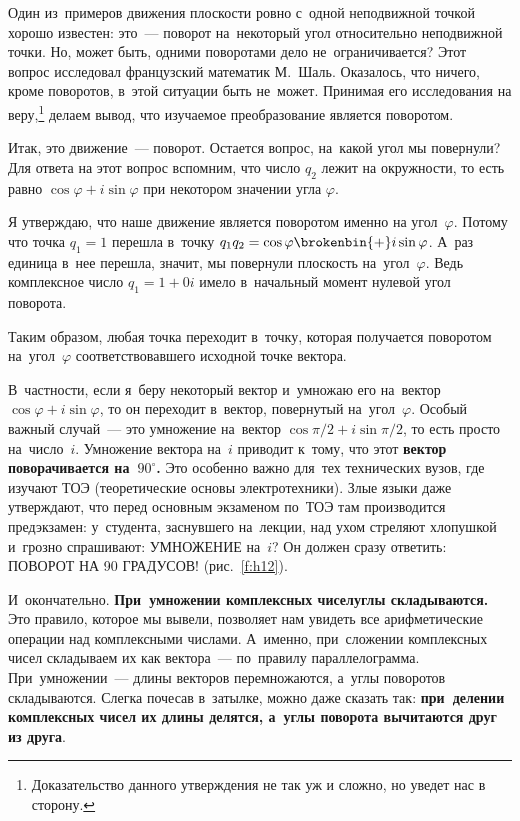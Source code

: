 Один из~примеров движения плоскости ровно с~одной неподвижной точкой хорошо
известен: это~--- поворот на~некоторый угол относительно неподвижной точки. Но,
может быть, одними поворотами дело не~ограничивается? Этот вопрос исследовал
французский математик М.~Шаль. Оказалось, что ничего, кроме поворотов, в~этой ситуации быть не~может.
Принимая его исследования на веру,\footnote{Доказательство
данного утверждения не так уж и сложно, но уведет нас в сторону.} делаем вывод, что
изучаемое преобразование является поворотом.

Итак, это движение~--- поворот. Остается вопрос, на~какой угол мы повернули?
Для ответа на этот вопрос вспомним, что число $q_2$ лежит на окружности, то
есть равно $\cos\varphi+i\sin\varphi$ при некотором значении угла $\varphi$.

Я утверждаю, что наше движение является поворотом именно на угол~$\varphi$.
Потому что точка $q_1=1$ перешла в~точку $q_1 q_2 = \cos\varphi\brokenbin{+}i\sin\varphi$.
А~раз единица в~нее перешла, значит, мы повернули плоскость на~угол~$\varphi$.
Ведь комплексное число $q_1=1+0i$ имело в~начальный момент нулевой угол поворота.

Таким образом, любая точка переходит в~точку, которая получается поворотом
на~угол~$\varphi$ соответствовавшего исходной точке вектора.

В~частности, если я~беру некоторый вектор и~умножаю его на~вектор $\cos\varphi+i\sin\varphi$, то он переходит в~вектор,
повернутый на~угол~$\varphi$. Особый важный случай~--- это умножение на~вектор $\cos \pi/2 + i \sin \pi/2$, то есть
просто на~число~$i$. Умножение вектора на~$i$ приводит к~тому, что этот \textbf{вектор поворачивается на~$90^{\circ}$.}
Это особенно важно для~тех технических вузов, где изучают ТОЭ (теоретические основы
электротехники). Злые языки даже утверждают, что перед основным экзаменом по~ТОЭ там производится
предэкзамен: у~студента, заснувшего на~лекции, над ухом стреляют хлопушкой и~грозно спрашивают:
УМНОЖЕНИЕ на~$i$? Он должен сразу ответить: ПОВОРОТ НА 90 ГРАДУСОВ! (рис.~\ref{f:h12}).

%


И~окончательно. \textbf{При~умножении комплексных чисел\linebreak углы складываются.} Это правило, которое мы вывели,
позволяет нам увидеть все арифметические операции над комплексными числами. А~именно, при~сложении
комплексных чисел складываем их как вектора~--- по~правилу параллелограмма. При~умножении~--- длины
векторов перемножаются, а~углы поворотов складываются. Слегка почесав в~затылке, можно даже сказать
так: \textbf{при~делении комплексных чисел их длины делятся, а~углы поворота вычитаются друг из друга}.



